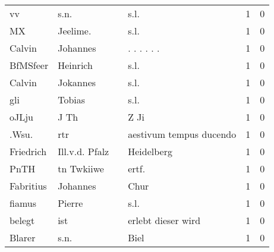 \begin{center}
\begin{tiny}
\begin{longtabu}{llllrr}
                       vv &                               s.n. &             &                                        s.l. &          1 &         0 \\
                       MX &                           Jeelime. &             &                                        s.l. &          1 &         0 \\
                   Calvin &                           Johannes &             &                                . . . . . .  &          1 &         0 \\
                 BfMSfeer &                           Heinrich &             &                                        s.l. &          1 &         0 \\
                   Calvin &                           Jokannes &             &                                        s.l. &          1 &         0 \\
                      gli &                             Tobias &             &                                        s.l. &          1 &         0 \\
                    oJLju &                               J Th &             &                                        Z Ji &          1 &         0 \\
                    .Wsu. &                                rtr &             &                     aestivum tempus ducendo &          1 &         0 \\
                Friedrich &                     Ill.v.d. Pfalz &             &                                  Heidelberg &          1 &         0 \\
                     PnTH &                         tn Twkiiwe &             &                                      ertf.  &          1 &         0 \\
                Fabritius &                           Johannes &             &                                        Chur &          1 &         0 \\
                   fiamus &                             Pierre &             &                                        s.l. &          1 &         0 \\
                   belegt &                                ist &             &                          erlebt dieser wird &          1 &         0 \\
                   Blarer &                               s.n. &             &                                        Biel &          1 &         0 \\

\end{longtabu}
\end{tiny}
\end{center}
